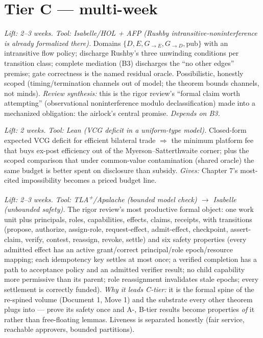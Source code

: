 \documentclass[11pt,a4paper]{article}
\begin{document}
\section{Tier C --- multi-week}
\begin{description}[leftmargin=0em,style=unboxed]
\item[C1. Sealed-Harbor noninterference via unwinding.] \emph{Lift: 2--3 weeks. Tool: Isabelle/HOL + AFP (Rushby intransitive-noninterference is already formalized there).} Domains $\{D,E,G_{\to E},G_{\to D},\text{pub}\}$ with an intransitive flow policy; discharge Rushby's three unwinding conditions per transition class; complete mediation (B3) discharges the ``no other edges'' premise; gate correctness is the named residual oracle. Possibilistic, honestly scoped (timing/termination channels out of model; the theorem bounds channels, not minds). \emph{Review synthesis:} this is the rigor review's ``formal claim worth attempting'' (observational noninterference modulo declassification) made into a mechanized obligation: the airlock's central promise. \emph{Depends on B3.}

\item[C2. Minimum viable take-rate.] \emph{Lift: 2 weeks. Tool: Lean (VCG deficit in a uniform-type model).} Closed-form expected VCG deficit for efficient bilateral trade $\Rightarrow$ the minimum platform fee that buys ex-post efficiency out of the Myerson--Satterthwaite corner; plus the scoped comparison that under common-value contamination (shared oracle) the same budget is better spent on disclosure than subsidy. \emph{Gives:} Chapter 7's most-cited impossibility becomes a priced budget line.

\item[C0 (new). The work-unit transition system.] \emph{Lift: 2--3 weeks. Tool: TLA\textsuperscript{+}/Apalache (bounded model check) $\to$ Isabelle (unbounded safety).} The rigor review's most productive formal object: one work unit plus principals, roles, capabilities, effects, claims, receipts, with transitions (propose, authorize, assign-role, request-effect, admit-effect, checkpoint, assert-claim, verify, contest, reassign, revoke, settle) and six safety properties (every admitted effect has an active grant/correct principal/role epoch/resource mapping; each idempotency key settles at most once; a verified completion has a path to acceptance policy and an admitted verifier result; no child capability more permissive than its parent; role reassignment invalidates stale epochs; every settlement is correctly funded). \emph{Why it leads C-tier:} it is the formal spine of the re-spined volume (Document 1, Move 1) and the substrate every other theorem plugs into --- prove its safety once and A-, B-tier results become properties \emph{of} it rather than free-floating lemmas. Liveness is separated honestly (fair service, reachable approvers, bounded partitions).
\end{description}
\end{document}
